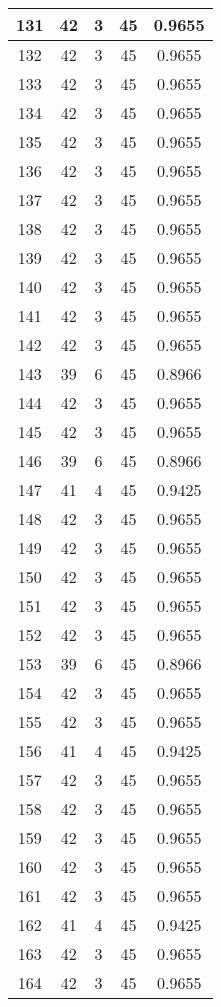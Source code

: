 \documentclass[letterpaper, 12pt]{article}
\begin{document}
\begin{longtable}{|c|c|c|c|c|}
\hline
131 & 42 & 3 & 45 & 0.9655 \\
\hline
132 & 42 & 3 & 45 & 0.9655 \\
\hline
133 & 42 & 3 & 45 & 0.9655 \\
\hline
134 & 42 & 3 & 45 & 0.9655 \\
\hline
135 & 42 & 3 & 45 & 0.9655 \\
\hline
136 & 42 & 3 & 45 & 0.9655 \\
\hline
137 & 42 & 3 & 45 & 0.9655 \\
\hline
138 & 42 & 3 & 45 & 0.9655 \\
\hline
139 & 42 & 3 & 45 & 0.9655 \\
\hline
140 & 42 & 3 & 45 & 0.9655 \\
\hline
141 & 42 & 3 & 45 & 0.9655 \\
\hline
142 & 42 & 3 & 45 & 0.9655 \\
\hline
143 & 39 & 6 & 45 & 0.8966 \\
\hline
144 & 42 & 3 & 45 & 0.9655 \\
\hline
145 & 42 & 3 & 45 & 0.9655 \\
\hline
146 & 39 & 6 & 45 & 0.8966 \\
\hline
147 & 41 & 4 & 45 & 0.9425 \\
\hline
148 & 42 & 3 & 45 & 0.9655 \\
\hline
149 & 42 & 3 & 45 & 0.9655 \\
\hline
150 & 42 & 3 & 45 & 0.9655 \\
\hline
151 & 42 & 3 & 45 & 0.9655 \\
\hline
152 & 42 & 3 & 45 & 0.9655 \\
\hline
153 & 39 & 6 & 45 & 0.8966 \\
\hline
154 & 42 & 3 & 45 & 0.9655 \\
\hline
155 & 42 & 3 & 45 & 0.9655 \\
\hline
156 & 41 & 4 & 45 & 0.9425 \\
\hline
157 & 42 & 3 & 45 & 0.9655 \\
\hline
158 & 42 & 3 & 45 & 0.9655 \\
\hline
159 & 42 & 3 & 45 & 0.9655 \\
\hline
160 & 42 & 3 & 45 & 0.9655 \\
\hline
161 & 42 & 3 & 45 & 0.9655 \\
\hline
162 & 41 & 4 & 45 & 0.9425 \\
\hline
163 & 42 & 3 & 45 & 0.9655 \\
\hline
164 & 42 & 3 & 45 & 0.9655 \\

\end{longtable}
\end{document}
